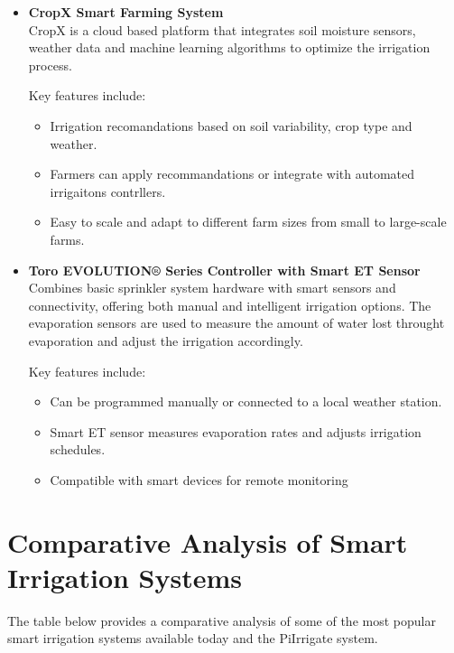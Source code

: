 \begin{itemize}
\begin{itemize}
    \item \textbf{CropX Smart Farming System} \\
    CropX is a cloud based platform that integrates soil moisture sensors, weather data and
    machine learning algorithms to optimize the irrigation process.

    Key features include:
    \begin{itemize}
      \item Irrigation recomandations based on soil variability, crop type and weather.
      \item Farmers can apply recommandations or integrate with automated irrigaitons contrllers.
      \item Easy to scale and adapt to different farm sizes from small to large-scale farms.
    \end{itemize}
  
    \item \textbf{Toro EVOLUTION® Series Controller with Smart ET Sensor} \\
    Combines basic sprinkler system hardware with smart sensors and connectivity,
    offering both manual and intelligent irrigation options. The evaporation sensors are used to measure
    the amount of water lost throught evaporation and adjust the irrigation accordingly.

    Key features include:
    \begin{itemize}
      \item Can be programmed manually or connected to a local weather station.
      \item Smart ET sensor measures evaporation rates and adjusts irrigation schedules.
      \item Compatible with smart devices for remote monitoring
    \end{itemize}
  \end{itemize}
\end{itemize}

\section{Comparative Analysis of Smart Irrigation Systems}
The table below provides a comparative analysis of some of the most popular smart 
irrigation systems available today and the PiIrrigate system.

